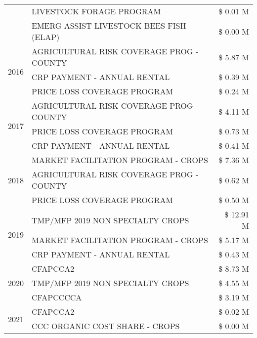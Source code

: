 \begin{tabular}{llr}
 & LIVESTOCK FORAGE PROGRAM & \$ 0.01 M \\
 & EMERG ASSIST LIVESTOCK BEES FISH (ELAP) & \$ 0.00 M \\
\cline{1-3}
\multirow[t]{3}{*}{2016} & AGRICULTURAL RISK COVERAGE PROG - COUNTY      & \$ 5.87 M \\
 & CRP PAYMENT - ANNUAL RENTAL                   & \$ 0.39 M \\
 & PRICE LOSS COVERAGE PROGRAM                   & \$ 0.24 M \\
\cline{1-3}
\multirow[t]{3}{*}{2017} & AGRICULTURAL RISK COVERAGE PROG - COUNTY & \$ 4.11 M \\
 & PRICE LOSS COVERAGE PROGRAM & \$ 0.73 M \\
 & CRP PAYMENT - ANNUAL RENTAL & \$ 0.41 M \\
\cline{1-3}
\multirow[t]{3}{*}{2018} & MARKET FACILITATION PROGRAM - CROPS & \$ 7.36 M \\
 & AGRICULTURAL RISK COVERAGE PROG - COUNTY & \$ 0.62 M \\
 & PRICE LOSS COVERAGE PROGRAM & \$ 0.50 M \\
\cline{1-3}
\multirow[t]{3}{*}{2019} & TMP/MFP 2019 NON SPECIALTY CROPS & \$ 12.91 M \\
 & MARKET FACILITATION PROGRAM - CROPS & \$ 5.17 M \\
 & CRP PAYMENT - ANNUAL RENTAL & \$ 0.43 M \\
\cline{1-3}
\multirow[t]{3}{*}{2020} & CFAPCCA2 & \$ 8.73 M \\
 & TMP/MFP 2019 NON SPECIALTY CROPS & \$ 4.55 M \\
 & CFAPCCCCA & \$ 3.19 M \\
\cline{1-3}
\multirow[t]{2}{*}{2021} & CFAPCCA2 & \$ 0.02 M \\
 & CCC ORGANIC COST SHARE - CROPS & \$ 0.00 M \\
\cline{1-3}
\bottomrule
\end{tabular}
